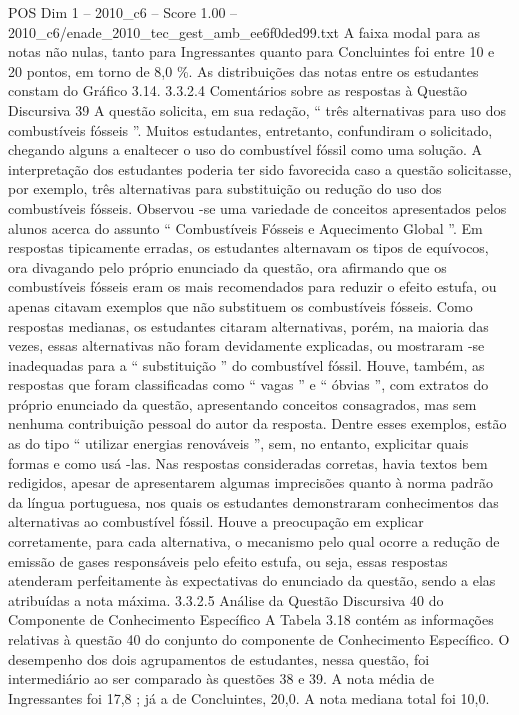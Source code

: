 \begin{textsample}{POS Dim 1 – 2010\_c6 – Score 1.00 – 2010\_c6/enade\_2010\_tec\_gest\_amb\_ee6f0ded99.txt}
A faixa modal para as notas não nulas, tanto para Ingressantes quanto para Concluintes foi entre 10 e 20 pontos, em torno de 8,0 \%.
As distribuições das notas entre os estudantes constam do Gráfico 3.14. 3.3.2.4 Comentários sobre as respostas à Questão Discursiva 39 A questão solicita, em sua redação, “ três alternativas para uso dos combustíveis fósseis ”.
Muitos estudantes, entretanto, confundiram o solicitado, chegando alguns a enaltecer o uso do combustível fóssil como uma solução.
A interpretação dos estudantes poderia ter sido favorecida caso a questão solicitasse, por exemplo, três alternativas para substituição ou redução do uso dos combustíveis fósseis.
Observou -se uma variedade de conceitos apresentados pelos alunos acerca do assunto “ Combustíveis Fósseis e Aquecimento Global ”.
Em respostas tipicamente erradas, os estudantes alternavam os tipos de equívocos, ora divagando pelo próprio enunciado da questão, ora afirmando que os combustíveis fósseis eram os mais recomendados para reduzir o efeito estufa, ou apenas citavam exemplos que não substituem os combustíveis fósseis.
Como respostas medianas, os estudantes citaram alternativas, porém, na maioria das vezes, essas alternativas não foram devidamente explicadas, ou mostraram -se inadequadas para a “ substituição ” do combustível fóssil.
Houve, também, as respostas que foram classificadas como “ vagas ” e “ óbvias ”, com extratos do próprio enunciado da questão, apresentando conceitos consagrados, mas sem nenhuma contribuição pessoal do autor da resposta.
Dentre esses exemplos, estão as do tipo “ utilizar energias renováveis ”, sem, no entanto, explicitar quais formas e como usá -las.
Nas respostas consideradas corretas, havia textos bem redigidos, apesar de apresentarem algumas imprecisões quanto à norma padrão da língua portuguesa, nos quais os estudantes demonstraram conhecimentos das alternativas ao combustível fóssil.
Houve a preocupação em explicar corretamente, para cada alternativa, o mecanismo pelo qual ocorre a redução de emissão de gases responsáveis pelo efeito estufa, ou seja, essas respostas atenderam perfeitamente às expectativas do enunciado da questão, sendo a elas atribuídas a nota máxima. 3.3.2.5 Análise da Questão Discursiva 40 do Componente de Conhecimento Específico A Tabela 3.18 contém as informações relativas à questão 40 do conjunto do componente de Conhecimento Específico.
O desempenho dos dois agrupamentos de estudantes, nessa questão, foi intermediário ao ser comparado às questões 38 e 39.
A nota média de Ingressantes foi 17,8 ; já a de Concluintes, 20,0.
A nota mediana total foi 10,0.

\end{textsample}
